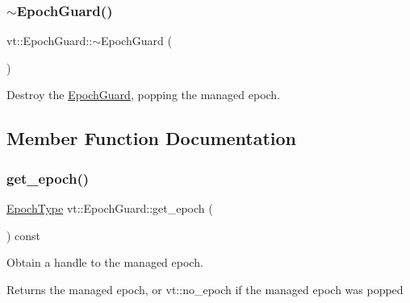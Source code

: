 \mbox{\label{structvt_1_1_epoch_guard_adf6677491e5d70a81645216b3cb65d0a}} 
\subsubsection{\texorpdfstring{$\sim$\+Epoch\+Guard()}{~EpochGuard()}}
{\footnotesize\ttfamily vt\+::\+Epoch\+Guard\+::$\sim$\+Epoch\+Guard (\begin{DoxyParamCaption}{ }\end{DoxyParamCaption})}



Destroy the \hyperlink{structvt_1_1_epoch_guard}{Epoch\+Guard}, popping the managed epoch. 



\subsection{Member Function Documentation}
\mbox{\label{structvt_1_1_epoch_guard_a41d2d7190be38fe256d6d8476a1f460e}} 
\subsubsection{\texorpdfstring{get\+\_\+epoch()}{get\_epoch()}}
{\footnotesize\ttfamily \hyperlink{namespacevt_a985a5adf291c34a3ca263b3378388236}{Epoch\+Type} vt\+::\+Epoch\+Guard\+::get\+\_\+epoch (\begin{DoxyParamCaption}{ }\end{DoxyParamCaption}) const\hspace{0.3cm}{\ttfamily [noexcept]}}



Obtain a handle to the managed epoch. 

\begin{DoxyReturn}{Returns}
the managed epoch, or vt\+::no\+\_\+epoch if the managed epoch was popped 
\end{DoxyReturn}
\mbox{\label{structvt_1_1_epoch_guard_adc52bcc301ca61c7cf3d52c725345ee6}} 

